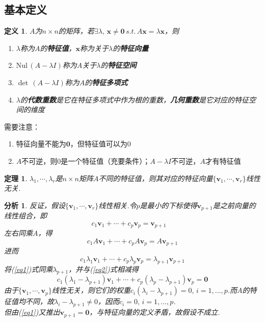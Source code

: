 \documentclass[11pt,UTF8]{ctexart}
\newtheorem{theorem}{定理}
\newtheorem{definition}{定义}
\newtheorem*{analysis}{分析}
\newcommand{\vb}[1]{\mathbf{#1}}
\begin{document}
\subsection{基本定义}
\begin{definition}$A$为$n\times n$的矩阵，若$\exists\lambda,\,\mathbf{x}\ne\mathbf{0}\,s.t.\,A\mathbf{x}=\lambda\mathbf{x}$，则
\begin{enumerate}
	\itemsep -2pt
	\item $\lambda$称为$A$的\textbf{特征值}，$\mathbf{x}$称为关于$\lambda$的\textbf{特征向量}
	\item $\mathrm{Nul}\,(A-\lambda I)$称为$A$关于$\lambda$的\textbf{特征空间}
	\item $\det\,(A-\lambda I)$称为$A$的\textbf{特征多项式}
	\item $\lambda$的\textbf{代数重数}是它在特征多项式中作为根的重数，\textbf{几何重数}是它对应的特征空间的维度
\end{enumerate}
\end{definition}
需要注意：
\begin{enumerate}
	\itemsep -3pt
	\item 特征向量不能为$\mathbf{0}$，但特征值可以为$0$
	\item $A$不可逆，则$0$是一个特征值（充要条件）；$A-\lambda I$不可逆，$A$才有特征值
\end{enumerate}
\begin{theorem}
\label{distinct_lambda}
$\lambda_1,\cdots,\lambda_r$是$n\times n$矩阵$A$不同的特征值，则其对应的特征向量$\{\mathbf{v}_1,\cdots,\mathbf{v}_r\}$线性无关.
\end{theorem}
\begin{analysis}
反证，假设$\{\mathbf{v}_1,\cdots,\mathbf{v}_r\}$线性相关.令$p$是最小的下标使得$\vb{v}_{p+1}$是之前向量的线性组合，即
\begin{equation}\label{eq1} c_1\vb{v}_1+\cdots+c_p\vb{v}_p=\vb{v}_{p+1}\quad\end{equation}
左右同乘$A$，得
\[c_1A\vb{v}_1+\cdots+c_pA\vb{v}_p=A\vb{v}_{p+1}\]
进而
\begin{equation}\label{eq2} c_1\lambda_1\vb{v}_1+\cdots+c_p\lambda_p\vb{v}_p=\lambda_{p+1}\vb{v}_{p+1}\end{equation}
将(\ref{eq1})式同乘$\lambda_{p+1}$，并与(\ref{eq2})式相减得
\[c_1(\lambda_1-\lambda_{p+1})\vb{v}_1+\cdots+c_p(\lambda_p-\lambda_{p+1})\vb{v}_p=\vb{0}\]
由于$\{\mathbf{v}_1,\cdots,\mathbf{v}_p\}$线性无关，则它们的权重$c_i(\lambda_i-\lambda_{p+1})=0,\,i=1,\dots,p$.而$A$的特征值均不同，故$\lambda_i-\lambda_{p+1}\ne 0$，因而$c_i=0,\,i=1,\dots,p$.\\
但由(\ref{eq1})又推出$\vb{v}_{p+1}=\vb{0}$，与特征向量的定义矛盾，故假设不成立.
\end{analysis}
\end{document}
